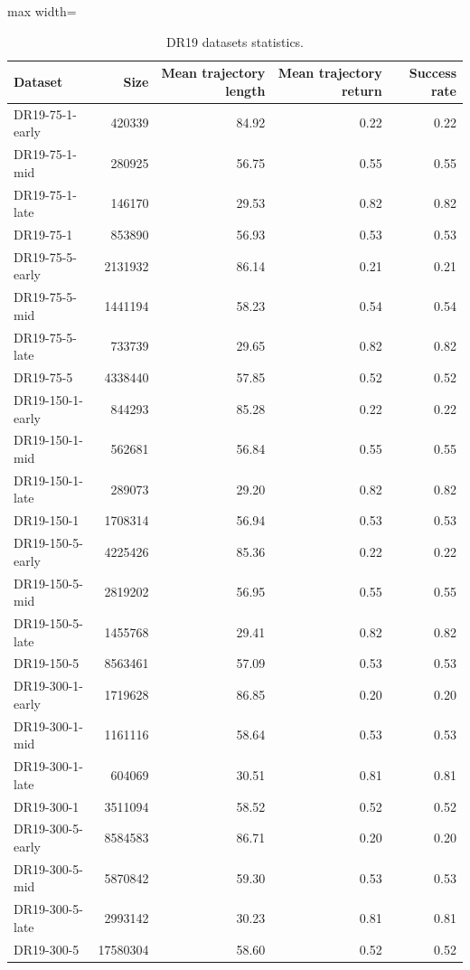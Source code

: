\documentclass{article}
\begin{document}
\begin{table}[ht]
    \label{tab:dr19_stats}
    \begin{center}
    \caption{DR19 datasets statistics.}
    \begin{small}
    \begin{adjustbox}{max width=\columnwidth}
		\begin{tabular}{l|rrrr}
		\toprule
	\textbf{Dataset} & \textbf{Size} & \textbf{Mean trajectory length} & \textbf{Mean trajectory return} & \textbf{Success rate}\\
\midrule
DR19-75-1-early & 420339 & 84.92 & 0.22 & 0.22\\
DR19-75-1-mid & 280925 & 56.75 & 0.55 & 0.55\\
DR19-75-1-late & 146170 & 29.53 & 0.82 & 0.82\\
DR19-75-1 & 853890 & 56.93 & 0.53 & 0.53\\
\midrule
DR19-75-5-early & 2131932 & 86.14 & 0.21 & 0.21\\
DR19-75-5-mid & 1441194 & 58.23 & 0.54 & 0.54\\
DR19-75-5-late & 733739 & 29.65 & 0.82 & 0.82\\
DR19-75-5 & 4338440 & 57.85 & 0.52 & 0.52\\
\midrule
DR19-150-1-early & 844293 & 85.28 & 0.22 & 0.22\\
DR19-150-1-mid & 562681 & 56.84 & 0.55 & 0.55\\
DR19-150-1-late & 289073 & 29.20 & 0.82 & 0.82\\
DR19-150-1 & 1708314 & 56.94 & 0.53 & 0.53\\
\midrule
DR19-150-5-early & 4225426 & 85.36 & 0.22 & 0.22\\
DR19-150-5-mid & 2819202 & 56.95 & 0.55 & 0.55\\
DR19-150-5-late & 1455768 & 29.41 & 0.82 & 0.82\\
DR19-150-5 & 8563461 & 57.09 & 0.53 & 0.53\\
\midrule
DR19-300-1-early & 1719628 & 86.85 & 0.20 & 0.20\\
DR19-300-1-mid & 1161116 & 58.64 & 0.53 & 0.53\\
DR19-300-1-late & 604069 & 30.51 & 0.81 & 0.81\\
DR19-300-1 & 3511094 & 58.52 & 0.52 & 0.52\\
\midrule
DR19-300-5-early & 8584583 & 86.71 & 0.20 & 0.20\\
DR19-300-5-mid & 5870842 & 59.30 & 0.53 & 0.53\\
DR19-300-5-late & 2993142 & 30.23 & 0.81 & 0.81\\
DR19-300-5 & 17580304 & 58.60 & 0.52 & 0.52\\
\bottomrule
\end{tabular}
        \end{adjustbox}
    \end{small}
    \end{center}
    \vskip -0.1in
\end{table}
\end{document}
